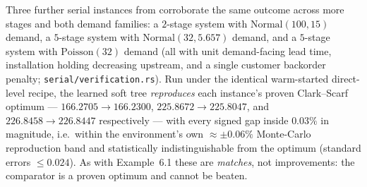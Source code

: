 Three further serial instances from \citet{snyder2019foundations} corroborate the same outcome across
more stages and both demand families: a $2$-stage system with $\mathrm{Normal}(100,15)$ demand, a
$5$-stage system with $\mathrm{Normal}(32,5.657)$ demand, and a $5$-stage system with
$\mathrm{Poisson}(32)$ demand (all with unit demand-facing lead time, installation holding decreasing
upstream, and a single customer backorder penalty; \texttt{serial/verification.rs}). Run under the
identical warm-started direct-level recipe, the learned soft tree \emph{reproduces} each instance's
proven Clark--Scarf optimum --- $166.2705 \to 166.2300$, $225.8672 \to 225.8047$, and
$226.8458 \to 226.8447$ respectively --- with every signed gap inside $0.03\%$ in magnitude, i.e.\
within the environment's own $\approx{\pm}0.06\%$ Monte-Carlo reproduction band and statistically
indistinguishable from the optimum (standard errors $\le 0.024$). As with Example~6.1 these are
\emph{matches}, not improvements: the comparator is a proven optimum and cannot be beaten.
